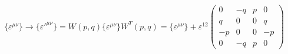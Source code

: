 \begin{equation}
\{\varepsilon ^{\mu \nu} \}\rightarrow \{\varepsilon'^{\mu \nu}\}  = W(p,q) \{\varepsilon^{\mu \nu}\}  W^T (p,q) =
 \{\varepsilon^{\mu \nu} \}+ \varepsilon^{12}\left( \begin{array}{cccc}
0 & -q & p & 0 \\
q & 0& 0 & q \\
-p & 0 & 0 &  -p \\
0 & -q & p & 0
\end{array} \right)
\label{20}
\end{equation}

